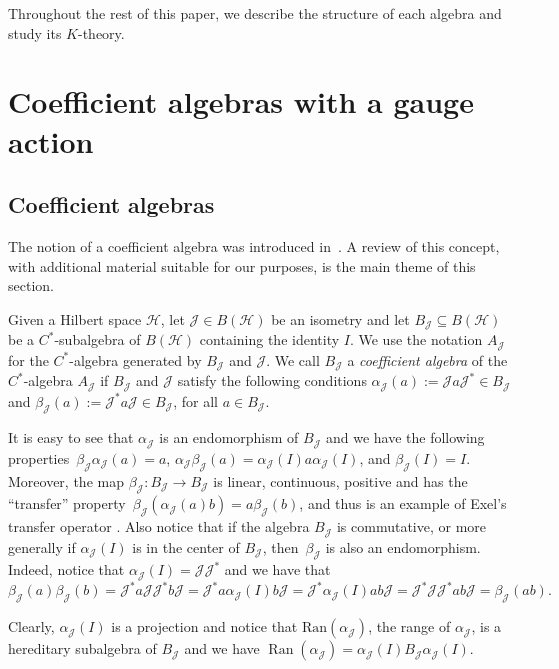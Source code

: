 \documentclass[pdftex]{sigma}
\DeclareMathOperator\Ran{Ran}
\newcommand{\jcal}{{\mathcal J}}
\numberwithin{equation}{section}
\begin{document}
Throughout the rest of this paper, we describe the structure of each algebra and study its $K$-theory.

\section{Coefficient algebras with a gauge action}\label{sec3}
\subsection{Coefficient algebras}
The notion of a coefficient algebra was introduced in~\cite{LO}. A review of this concept, with additional material suitable for our purposes, is the main theme of this section.

Given a Hilbert space $\mathcal{H}$, let ${\mathcal{J}} \in B(\mathcal{H})$ be an isometry and let $B_\jcal \subseteq B(\mathcal{H})$ be a $C^*$-subalgebra of $B(\mathcal{H})$ containing the identity $I$. We use the notation $A_{\mathcal{J}}$ for the $C^*$-algebra generated by $B_\jcal$ and ${\mathcal{J}}$. We call $B_\jcal$ a {\it coefficient algebra} of the $C^*$-algebra $A_{\mathcal{J}}$ if $B_\jcal$ and ${\mathcal{J}}$ satisfy the following conditions
$
\alpha_\jcal(a):={\mathcal{J}} a{\mathcal{J}}^* \in B_\jcal
$
and
$
\beta_\jcal(a):={\mathcal{J}}^*a{\mathcal{J}} \in B_\jcal$,
for all $a\in B_\jcal$.

It is easy to see that $\alpha_\jcal$ is an endomorphism of $B_\jcal$ and we have the following properties~${
\beta_\jcal\alpha_\jcal(a)=a}$, $ \alpha_\jcal\beta_\jcal(a)=\alpha_\jcal(I)a\alpha_\jcal(I)$, and $ \beta_\jcal(I)=I$.
Moreover, the map $\beta_\jcal\colon B_\jcal\to B_\jcal$ is linear, continuous, positive and has the ``transfer'' property~${
\beta_\jcal(\alpha_\jcal(a)b)=a\beta_\jcal(b)}$,
and thus is an example of Exel's transfer operator \cite{E}. Also notice that if the algebra $B_\jcal$ is commutative, or more generally if $\alpha_\jcal(I)$ is in the center of $B_\jcal$, then~$\beta_\jcal$ is also an endomorphism. Indeed, notice that $\alpha_\jcal(I) = \jcal\jcal^*$ and we have that
\begin{equation*}
\beta_\jcal(a)\beta_\jcal(b) = \jcal^*a\jcal\jcal^*b\jcal=\jcal^*a\alpha_\jcal(I)b\jcal=\jcal^*\alpha_\jcal(I)ab\jcal=\jcal^*\jcal\jcal^*ab\jcal=\beta_\jcal(ab) .
\end{equation*}

Clearly, $\alpha_\jcal(I)$ is a projection and notice that $\textrm{Ran}(\alpha_\jcal)$, the range of $\alpha_\jcal$, is a hereditary subalgebra of $B_\jcal$ and we have
$\Ran(\alpha_\jcal)=\alpha_\jcal(I)B_\jcal\alpha_\jcal(I)$.
\end{document}
